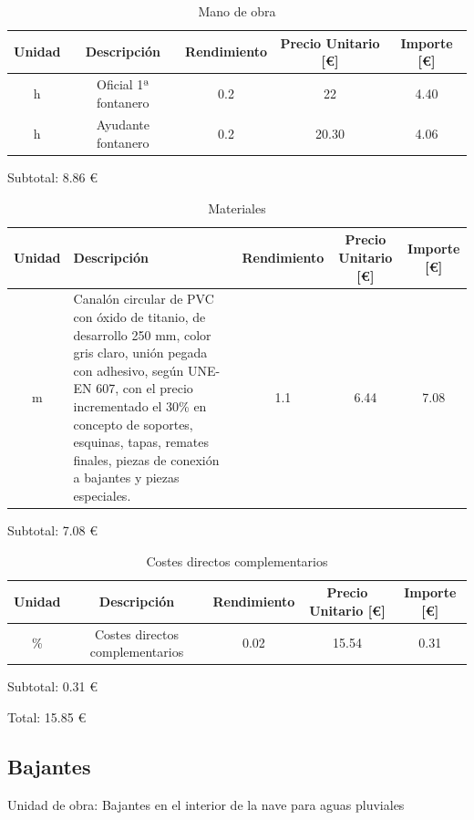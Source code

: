 \documentclass[../main.tex]{subfiles}
\begin{document}
\begin{table}[H]
    \centering
    \begin{tabular}{c|c|c|c|c}
    Unidad & Descripción & Rendimiento & Precio Unitario [€] & Importe [€] \\ \hline
    h&Oficial 1ª fontanero & 0.2 & 22 & 4.40 \\
    h&Ayudante fontanero & 0.2 & 20.30 & 4.06 \\
    
    \end{tabular}
    \caption{Mano de obra}
\end{table}

Subtotal: 8.86 €

\begin{table}[H]
    \centering
    \begin{tabular}{c|p{5.5cm}|c|c|c}
    Unidad & Descripción & Rendimiento & Precio Unitario [€] & Importe [€] \\ \hline
    m&Canalón circular de PVC con óxido de titanio, de desarrollo 250 mm, color gris claro, unión pegada con adhesivo, según UNE-EN 607, con el precio incrementado el 30\% en concepto de soportes, esquinas, tapas, remates finales, piezas de conexión a bajantes y piezas especiales.& 1.1 & 6.44 & 7.08 \\
    
    \end{tabular}
    \caption{Materiales}
\end{table}

Subtotal: 7.08 €

\begin{table}[H]
    \centering
    \begin{tabular}{c|c|c|c|c}
    Unidad & Descripción & Rendimiento & Precio Unitario [€] & Importe [€] \\ \hline
    \% & Costes directos complementarios & 0.02 & 15.54 & 0.31 \\
    
    \end{tabular}
    \caption{Costes directos complementarios}
\end{table} 

Subtotal: 0.31 €
 
Total: 15.85 €

\subsection{Bajantes}

Unidad de obra: Bajantes en el interior de la nave para aguas pluviales
\end{document}
